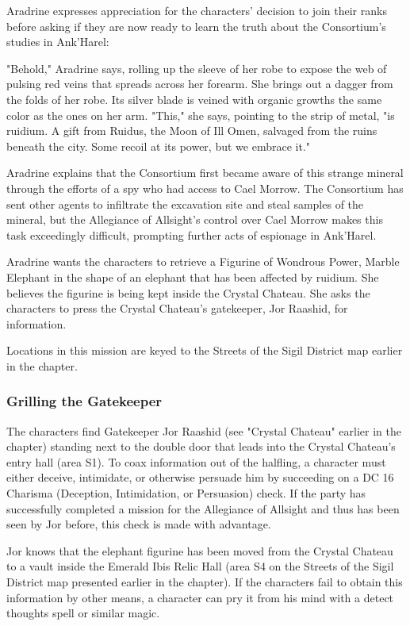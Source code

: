 \documentclass[10pt,a4paper,twoside,bg=print,twocolumn,openany,nodeprecatedcode]{dndbook}
\begin{document}
Aradrine expresses appreciation for the characters' decision to join their ranks before asking if they are now ready to learn the truth about the Consortium's studies in Ank'Harel:

\begin{DndReadAloud}{}
"Behold," Aradrine says, rolling up the sleeve of her robe to expose the web of pulsing red veins that spreads across her forearm. She brings out a dagger from the folds of her robe. Its silver blade is veined with organic growths the same color as the ones on her arm. "This," she says, pointing to the strip of metal, "is ruidium. A gift from Ruidus, the Moon of Ill Omen, salvaged from the ruins beneath the city. Some recoil at its power, but we embrace it."

\end{DndReadAloud}

Aradrine explains that the Consortium first became aware of this strange mineral through the efforts of a spy who had access to Cael Morrow. The Consortium has sent other agents to infiltrate the excavation site and steal samples of the mineral, but the Allegiance of Allsight's control over Cael Morrow makes this task exceedingly difficult, prompting further acts of espionage in Ank'Harel.

Aradrine wants the characters to retrieve a Figurine of Wondrous Power, Marble Elephant in the shape of an elephant that has been affected by ruidium. She believes the figurine is being kept inside the Crystal Chateau. She asks the characters to press the Crystal Chateau's gatekeeper, Jor Raashid, for information.

Locations in this mission are keyed to the Streets of the Sigil District map earlier in the chapter.

\subsubsection{Grilling the Gatekeeper}
The characters find Gatekeeper Jor Raashid (see "Crystal Chateau" earlier in the chapter) standing next to the double door that leads into the Crystal Chateau's entry hall (area S1). To coax information out of the halfling, a character must either deceive, intimidate, or otherwise persuade him by succeeding on a DC 16 Charisma (Deception, Intimidation, or Persuasion) check. If the party has successfully completed a mission for the Allegiance of Allsight and thus has been seen by Jor before, this check is made with advantage.

Jor knows that the elephant figurine has been moved from the Crystal Chateau to a vault inside the Emerald Ibis Relic Hall (area S4 on the Streets of the Sigil District map presented earlier in the chapter). If the characters fail to obtain this information by other means, a character can pry it from his mind with a detect thoughts spell or similar magic.
\end{document}
